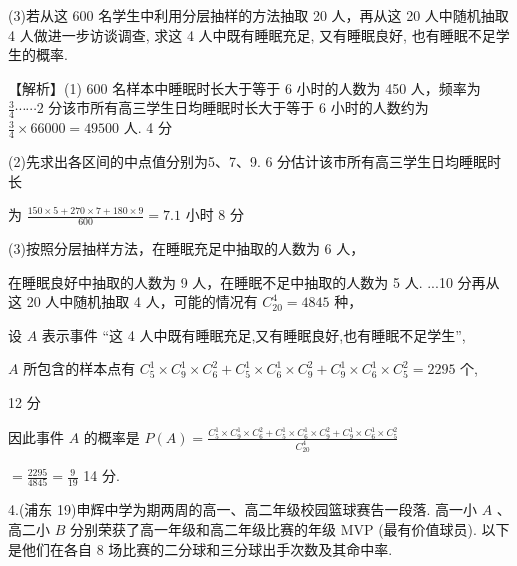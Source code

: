 \documentclass[10pt]{article}
\begin{document}
(3)若从这 600 名学生中利用分层抽样的方法抽取 20 人，再从这 20 人中随机抽取 4 人做进一步访谈调查, 求这 4 人中既有睡眠充足, 又有睡眠良好, 也有睡眠不足学生的概率.

【解析】(1) 600 名样本中睡眠时长大于等于 6 小时的人数为 450 人，频率为 \(\frac{3}{4}\cdots \cdots 2\) 分该市所有高三学生日均睡眠时长大于等于 6 小时的人数约为 \(\frac{3}{4} \times  {66000} = {49500}\) 人. 4 分

(2)先求出各区间的中点值分别为5、7、9. 6 分估计该市所有高三学生日均睡眠时长

为 \(\frac{{150} \times  5 + {270} \times  7 + {180} \times  9}{600} = {7.1}\) 小时 8 分

(3)按照分层抽样方法，在睡眠充足中抽取的人数为 6 人，

在睡眠良好中抽取的人数为 9 人，在睡眠不足中抽取的人数为 5 人. ...10 分再从这 20 人中随机抽取 4 人，可能的情况有 \({C}_{20}^{4} = {4845}\) 种，

设 \(A\) 表示事件 “这 4 人中既有睡眠充足,又有睡眠良好,也有睡眠不足学生”,

\(A\) 所包含的样本点有 \({C}_{5}^{1} \times  {C}_{9}^{1} \times  {C}_{6}^{2} + {C}_{5}^{1} \times  {C}_{6}^{1} \times  {C}_{9}^{2} + {C}_{9}^{1} \times  {C}_{6}^{1} \times  {C}_{5}^{2} = {2295}\) 个,

12 分

因此事件 \(A\) 的概率是 \(P\left( A\right)  = \frac{{C}_{5}^{1} \times  {C}_{9}^{1} \times  {C}_{6}^{2} + {C}_{5}^{1} \times  {C}_{6}^{1} \times  {C}_{9}^{2} + {C}_{9}^{1} \times  {C}_{6}^{1} \times  {C}_{5}^{2}}{{C}_{20}^{4}}\)

\(= \frac{2295}{4845} = \frac{9}{19}\) 14 分.

4.(浦东 19)申辉中学为期两周的高一、高二年级校园篮球赛告一段落. 高一小 \(A\) 、高二小 \(B\) 分别荣获了高一年级和高二年级比赛的年级 MVP (最有价值球员). 以下是他们在各自 8 场比赛的二分球和三分球出手次数及其命中率.

\begin{center}
\end{center}
\end{document}

